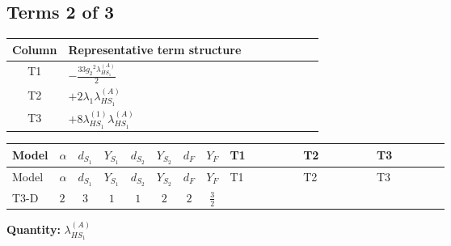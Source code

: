 \documentclass[8pt]{article}
\begin{document}
\begin{landscape}
\subsection*{Terms 2 of 3}
\begin{center}
\begin{tabular}{@{}c >{\raggedright\arraybackslash}p{0.82\linewidth}@{}}
\toprule
Column & Representative term structure \\
\midrule
T1 & \(\displaystyle -\frac{33 {g_2}^2 {\lambda_{HS_1}^{(A)}}}{2}\) \\
\midrule
T2 & \(\displaystyle +2 {\lambda_1} {\lambda_{HS_1}^{(A)}}\) \\
\midrule
T3 & \(\displaystyle +8 {\lambda_{HS_1}^{(1)}} {\lambda_{HS_1}^{(A)}}\) \\
\midrule
\bottomrule
\end{tabular}
\end{center}
\smallskip
\tiny
\begin{longtable}{@{}llcccccc >{\raggedright\arraybackslash}p{0.21\linewidth} >{\raggedright\arraybackslash}p{0.21\linewidth} >{\raggedright\arraybackslash}p{0.21\linewidth}@{}}
\toprule
Model & $\alpha$ & $d_{S_1}$ & $Y_{S_1}$ & $d_{S_2}$ & $Y_{S_2}$ & $d_F$ & $Y_F$ & T1 & T2 & T3 \\
\midrule
\endfirsthead
\toprule
Model & $\alpha$ & $d_{S_1}$ & $Y_{S_1}$ & $d_{S_2}$ & $Y_{S_2}$ & $d_F$ & $Y_F$ & T1 & T2 & T3 \\
\midrule
\endhead
T3-D & $2$ & $3$ & $1$ & $1$ & $2$ & $2$ & $\frac{3}{2}$ & \scriptsize\adjustbox{max width=\linewidth}{$\begin{gathered} -\frac{33 {g_2}^2 {\lambda_{HS_1}^{(A)}}}{2}\end{gathered}$} & \scriptsize\adjustbox{max width=\linewidth}{$\begin{gathered} +2 {\lambda_1} {\lambda_{HS_1}^{(A)}}\end{gathered}$} & \scriptsize\adjustbox{max width=\linewidth}{$\begin{gathered} +8 {\lambda_{HS_1}^{(1)}} {\lambda_{HS_1}^{(A)}}\end{gathered}$} \\
\midrule
\bottomrule
\end{longtable}
\clearpage
\noindent\textbf{Quantity: }$\lambda_{HS_1}^{(A)}$\par\smallskip

\end{landscape}
\end{document}
